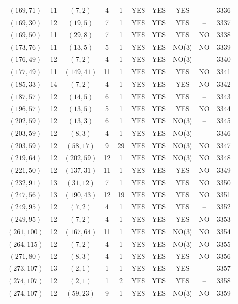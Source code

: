 \begin{longtable}{|c|c|c|c|c|c|c|c|c|c|}
$(169, 71)$ & 11 & $(7, 2)$ & 4 & 1 & YES & YES & YES & -- & 3336\\
$(169, 30)$ & 12 & $(19, 5)$ & 7 & 1 & YES & YES & YES & -- & 3337\\
$(169, 50)$ & 11 & $(29, 8)$ & 7 & 1 & YES & YES & YES & NO & 3338\\
$(173, 76)$ & 11 & $(13, 5)$ & 5 & 1 & YES & YES & NO(3) & NO & 3339\\
$(176, 49)$ & 12 & $(7, 2)$ & 4 & 1 & YES & YES & NO(3) & -- & 3340\\
$(177, 49)$ & 11 & $(149, 41)$ & 11 & 1 & YES & YES & YES & NO & 3341\\
$(185, 33)$ & 14 & $(7, 2)$ & 4 & 1 & YES & YES & YES & NO & 3342\\
$(187, 57)$ & 12 & $(14, 5)$ & 6 & 1 & YES & YES & YES & -- & 3343\\
$(196, 57)$ & 12 & $(13, 5)$ & 5 & 1 & YES & YES & YES & NO & 3344\\
$(202, 59)$ & 12 & $(13, 3)$ & 6 & 1 & YES & YES & NO(3) & -- & 3345\\
$(203, 59)$ & 12 & $(8, 3)$ & 4 & 1 & YES & YES & NO(3) & -- & 3346\\
$(203, 59)$ & 12 & $(58, 17)$ & 9 & 29 & YES & YES & NO(3) & NO & 3347\\
$(219, 64)$ & 12 & $(202, 59)$ & 12 & 1 & YES & YES & NO(3) & NO & 3348\\
$(221, 50)$ & 12 & $(137, 31)$ & 11 & 1 & YES & YES & YES & NO & 3349\\
$(232, 91)$ & 13 & $(31, 12)$ & 7 & 1 & YES & YES & YES & NO & 3350\\
$(247, 56)$ & 13 & $(190, 43)$ & 12 & 19 & YES & YES & YES & NO & 3351\\
$(249, 95)$ & 12 & $(7, 2)$ & 4 & 1 & YES & YES & YES & -- & 3352\\
$(249, 95)$ & 12 & $(7, 2)$ & 4 & 1 & YES & YES & YES & NO & 3353\\
$(261, 100)$ & 12 & $(167, 64)$ & 11 & 1 & YES & YES & NO(3) & NO & 3354\\
$(264, 115)$ & 12 & $(7, 2)$ & 4 & 1 & YES & YES & NO(3) & NO & 3355\\
$(271, 80)$ & 12 & $(8, 3)$ & 4 & 1 & YES & YES & YES & NO & 3356\\
$(273, 107)$ & 13 & $(2, 1)$ & 1 & 1 & YES & YES & YES & -- & 3357\\
$(274, 107)$ & 12 & $(2, 1)$ & 1 & 2 & YES & YES & YES & -- & 3358\\
$(274, 107)$ & 12 & $(59, 23)$ & 9 & 1 & YES & YES & NO(3) & NO & 3359\\

\end{longtable}
